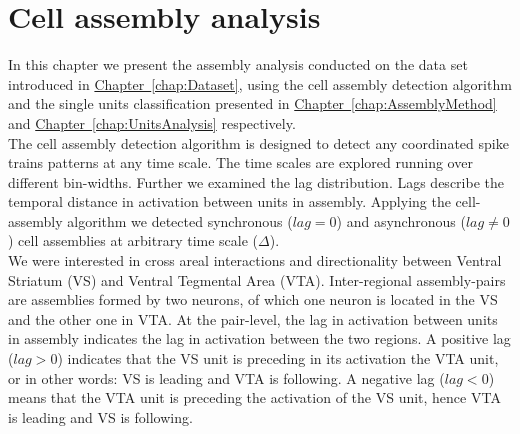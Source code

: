 \chapter{Cell assembly analysis}
\label{chap:AssemblyAnalysis}
In this chapter we present the assembly analysis conducted on the data set introduced in \hyperref[chap:Dataset]{Chapter~\ref*{chap:Dataset}}, using the cell assembly detection algorithm and the single units classification presented in \hyperref[chap:AssemblyMethod]{Chapter~\ref*{chap:AssemblyMethod}} and \hyperref[chap:UnitsAnalysis]{Chapter~\ref*{chap:UnitsAnalysis}} respectively.\\
The cell assembly detection algorithm is designed to detect any coordinated spike trains patterns at any time scale. The time scales are explored running over different bin-widths. Further we examined the lag distribution. Lags describe the temporal distance in activation between units in assembly. Applying the cell-assembly algorithm we detected synchronous ($lag=0$) and asynchronous ($lag\neq0$) cell assemblies at arbitrary time scale ($\Delta$).\\
We were interested in cross areal interactions and directionality between Ventral Striatum (VS) and Ventral Tegmental Area (VTA).  Inter-regional assembly-pairs are assemblies formed by two neurons, of which one neuron is located in  the VS and the other one in VTA. At the pair-level, the lag in activation between units in assembly indicates the lag in activation between the two regions. A positive lag ($lag>0$) indicates that the VS unit is preceding in its activation the VTA unit, or in other words: VS is leading and VTA is following. A negative lag ($lag<0$) means that the VTA unit is preceding the activation of the VS unit, hence VTA is leading and VS is following.
